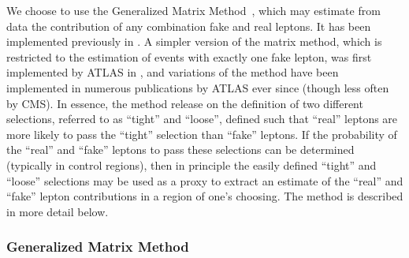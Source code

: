 We choose to use the Generalized Matrix Method~\cite{Gillam:2014xua}, 
which may estimate from data the contribution of any combination
fake and real leptons. It has been implemented previously in 
\cite{Arguin:1558979}. A simpler version of the matrix
method, which is restricted to the estimation of events with 
exactly one fake lepton, 
was first implemented by ATLAS in \cite{ATLAS-CONF-2010-087}, 
and variations of the method have been implemented in numerous publications
by ATLAS ever since (though less often by CMS).
In essence, the method release on the definition of two different selections,
referred to as ``tight'' and ``loose'', defined such that
``real'' leptons are more likely to pass the ``tight'' selection
than ``fake'' leptons. If the probability of the ``real'' and 
``fake'' leptons to pass these selections can be determined (typically
in control regions), 
then in principle the easily defined
``tight'' and ``loose'' selections may be used
as a proxy
to extract an estimate of the 
``real'' and ``fake'' lepton
contributions in a region of one's choosing.
The method is described in more detail below.



\subsubsection{Generalized Matrix Method}
\label{sec:mxm}


